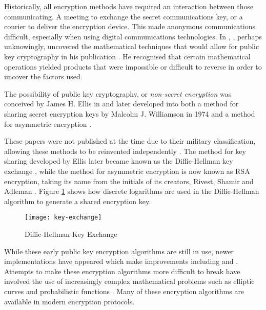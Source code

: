 \documentclass{ecuthesis}
\begin{document}
Historically, all encryption methods have required an interaction between those
communicating. A meeting to exchange the secret communications key, or a
courier to deliver the encryption device. This made anonymous communications
difficult, especially when using digital communications technologies.  In
\citeyear{Jevons:1874vn}, \citeauthor{Jevons:1874vn}, perhaps
unknowingly, uncovered the mathematical techniques that would allow for public
key cryptography in his publication . He recognised
that certain mathematical operations yielded products that were impossible or
difficult to reverse in order to uncover the factors used.

The possibility of public key cryptography, or \emph{non-secret
encryption} was conceived by James H. Ellis in \citeyear{Ellis:1970p3249} and
later developed into both a method for sharing secret encryption keys by
Malcolm J. Williamson in 1974 \parencite{Singh:1999:CBE} and a method for
asymmetric encryption \parencite{Cocks:1973p3265}.

These papers were not published at the time due to their military
classification, allowing these methods to be reinvented independently
\parencite{Singh:1999:CBE}. The method for key sharing developed by Ellis
later became known as the Diffie-Hellman key exchange
\parencite{Diffie:1976p585}, while the method for asymmetric encryption is now
known as RSA encryption, taking its name from the initials of its creators,
Rivest, Shamir and Adleman \parencite{Rivest:1978p708}. Figure
\ref{key-exchange} shows how discrete logarithms are used in the Diffie-Hellman
algorithm to generate a shared encryption key.

\begin{figure}[H]
  \centering\texttt{[image: key-exchange]}
  \caption{Diffie-Hellman Key Exchange}
  \label{key-exchange}
\end{figure}


While these early public key encryption algorithms are still in use, newer
implementations have appeared which make improvements including
\textcite*{ElGamal:1985p529} and \textcite{Cramer:1998p3186}. Attempts to make
these encryption algorithms more difficult to break have involved the use of
increasingly complex mathematical problems such as elliptic curves
\parencite{Miller:1986p2966,Koblitz:1987p3109} and probabilistic functions
\parencite{Paillier:1999p3152}. Many of these encryption algorithms are
available in modern encryption protocols.
\end{document}
